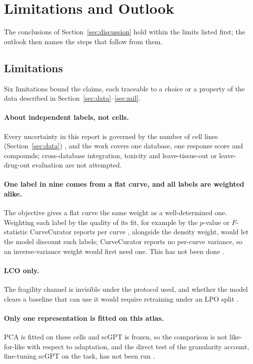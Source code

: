 \section{Limitations and Outlook}
\label{sec:limitations}

The conclusions of Section~\ref{sec:discussion} hold within the limits listed first; the outlook then
names the steps that follow from them.

\subsection{Limitations}

Six limitations bound the claims, each traceable to a choice or a property of the data described in
Section~\ref{sec:data}--\ref{sec:mil}.

\paragraph{About \NLinesCV{} independent labels, not \NCells{} cells.} Every uncertainty in this report is
governed by the number of cell lines (Section~\ref{sec:data}) \cite{lazic2010}, and the work covers
one database, one response score and \NPanel{} compounds; cross-database integration, toxicity and
leave-tissue-out or leave-drug-out evaluation \cite{dreval} are not attempted.

\paragraph{One label in nine comes from a flat curve, and all labels are weighted alike.} The objective
gives a flat curve the same weight as a well-determined one. Weighting each label by the quality of its
fit, for example by the $p$-value or $F$-statistic CurveCurator reports per curve
\cite{bayer2023curvecurator}, alongside the density weight, would let the model discount such labels;
CurveCurator reports no per-curve variance, so an inverse-variance weight would first need one. This
has not been done \cite{haibekains2013}.

\paragraph{LCO only.} The fragility channel is invisible under the protocol used, and whether the model
clears a baseline that can use it would require retraining under an LPO split \cite{dreval}.

\paragraph{Only one representation is fitted on this atlas.} PCA is fitted on these cells and scGPT is
frozen, so the comparison is not like-for-like with respect to adaptation, and the direct test of the
granularity account, fine-tuning scGPT on the task, has not been run \cite{scgpt}.

